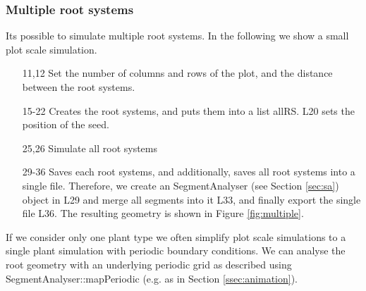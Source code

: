 

\subsubsection*{Multiple root systems}

Its possible to simulate multiple root systems. In the following we show a small plot scale simulation.



\begin{itemize}

\item[11,12] Set the number of columns and rows of the plot, and the distance between the root systems.

\item[15-22] Creates the root systems, and puts them into a list allRS. L20 sets the position of the seed. 

\item[25,26] Simulate all root systems 

\item[29-36] Saves each root systems, and additionally, saves all root systems into a single file. 
Therefore, we create an SegmentAnalyser (see Section \ref{sec:sa}) object in L29 and merge all segments into it L33, 
and finally export the single file L36. The resulting geometry is shown in Figure \ref{fig:multiple}.

\end{itemize}

If we consider only one plant type we often simplify plot scale simulations to a single plant simulation with periodic boundary conditions. We can analyse the root geometry with an underlying periodic grid as described using SegmentAnalyser::mapPeriodic (e.g. as in Section \ref{ssec:animation}). 
% 
